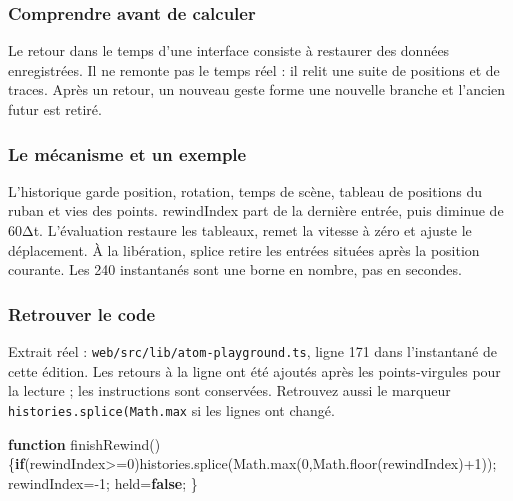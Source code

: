 \documentclass[
  canadien,
  11pt,
  letterpaper,
]{article}
\newenvironment{Shaded}{}{}
\newcommand{\BuiltInTok}[1]{\textcolor[rgb]{0.00,0.50,0.00}{#1}}
\newcommand{\ControlFlowTok}[1]{\textcolor[rgb]{0.00,0.44,0.13}{\textbf{#1}}}
\newcommand{\DecValTok}[1]{\textcolor[rgb]{0.25,0.63,0.44}{#1}}
\newcommand{\FunctionTok}[1]{\textcolor[rgb]{0.02,0.16,0.49}{#1}}
\newcommand{\KeywordTok}[1]{\textcolor[rgb]{0.00,0.44,0.13}{\textbf{#1}}}
\newcommand{\NormalTok}[1]{#1}
\newcommand{\OperatorTok}[1]{\textcolor[rgb]{0.40,0.40,0.40}{#1}}
\begin{document}
\subsubsection{Comprendre avant de
calculer}\label{comprendre-avant-de-calculer-12}

Le retour dans le temps d'une interface consiste à restaurer des données
enregistrées. Il ne remonte pas le temps réel : il relit une suite de
positions et de traces. Après un retour, un nouveau geste forme une
nouvelle branche et l'ancien futur est retiré.

\subsubsection{Le mécanisme et un
exemple}\label{le-muxe9canisme-et-un-exemple-12}

L'historique garde position, rotation, temps de scène, tableau de
positions du ruban et vies des points. rewindIndex part de la dernière
entrée, puis diminue de 60Δt. L'évaluation restaure les tableaux, remet
la vitesse à zéro et ajuste le déplacement. À la libération, splice
retire les entrées situées après la position courante. Les 240
instantanés sont une borne en nombre, pas en secondes.

\subsubsection{Retrouver le code}\label{retrouver-le-code-12}

Extrait réel : \texttt{web/src/lib/atom-playground.ts}, ligne 171 dans
l'instantané de cette édition. Les retours à la ligne ont été ajoutés
après les points-virgules pour la lecture ; les instructions sont
conservées. Retrouvez aussi le marqueur
\texttt{histories.splice(Math.max} si les lignes ont changé.

\begin{Shaded}
\begin{Highlighting}[]
\KeywordTok{function} \FunctionTok{finishRewind}\NormalTok{()\{}\ControlFlowTok{if}\NormalTok{(rewindIndex}\OperatorTok{\textgreater{}=}\DecValTok{0}\NormalTok{)histories}\OperatorTok{.}\FunctionTok{splice}\NormalTok{(}\BuiltInTok{Math}\OperatorTok{.}\FunctionTok{max}\NormalTok{(}\DecValTok{0}\OperatorTok{,}\BuiltInTok{Math}\OperatorTok{.}\FunctionTok{floor}\NormalTok{(rewindIndex)}\OperatorTok{+}\DecValTok{1}\NormalTok{))}\OperatorTok{;}
\NormalTok{rewindIndex}\OperatorTok{={-}}\DecValTok{1}\OperatorTok{;}
\NormalTok{held}\OperatorTok{=}\KeywordTok{false}\OperatorTok{;}
\NormalTok{\}}
\end{Highlighting}
\end{Shaded}
\end{document}
